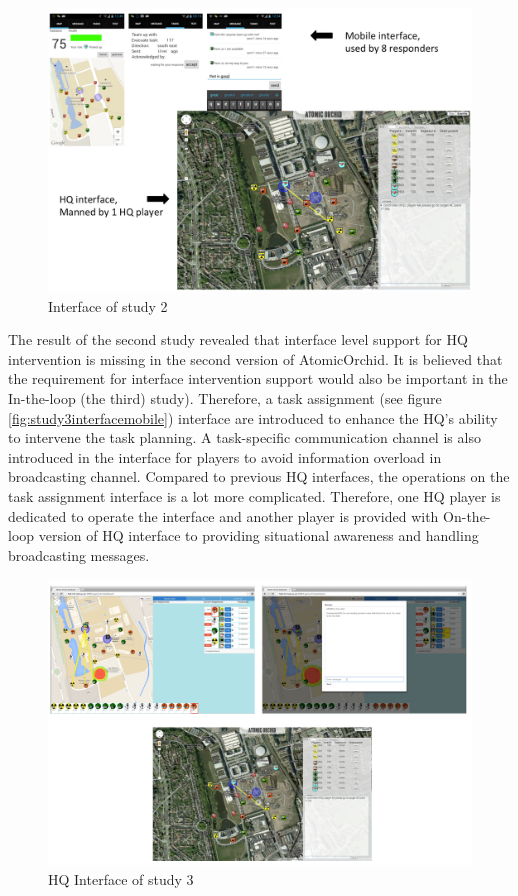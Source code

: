 \begin{figure}[H]
  \centering
  \includegraphics[width=1\textwidth]{img/conclusion/study2interface}
  \caption{Interface of study 2}
  \label{fig:study2interface}
\end{figure}

The result of the second study revealed that interface level support for HQ intervention is missing in the second version of AtomicOrchid. It is believed that the requirement for interface intervention support would also be important in the In-the-loop (the third) study). Therefore, a task assignment (see figure \ref{fig:study3interfacemobile}) interface are introduced to enhance the HQ's ability to intervene the task planning. A task-specific communication channel is also introduced in the interface for players to avoid information overload in broadcasting channel. Compared to previous HQ interfaces, the operations on the task assignment interface is a lot more complicated. Therefore, one HQ player is dedicated to operate the interface and another player is provided with On-the-loop version of HQ interface to providing situational awareness and handling broadcasting messages. 

\begin{figure}[H]
  \centering
  \includegraphics[width=1\textwidth]{img/conclusion/study3interfaceHQ}
  \caption{HQ Interface of study 3}
  \label{fig:study3interfacehq}
\end{figure}

